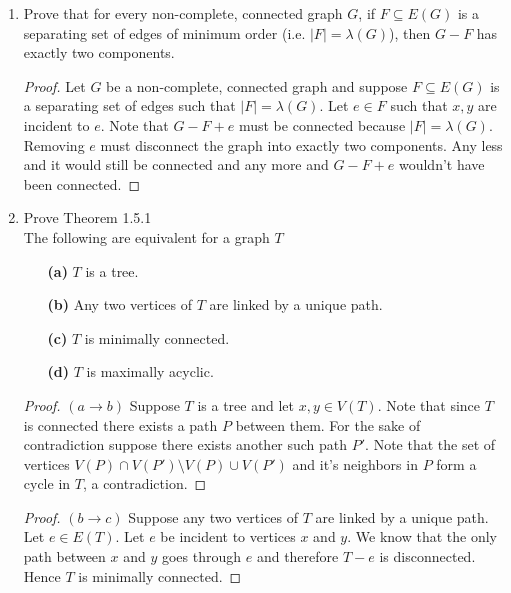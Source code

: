 \documentclass[12pt]{article}
\begin{document}
\begin{enumerate}
	\item Prove that for every non-complete, connected graph $G$, if $F \subseteq E(G)$ is a separating set of edges of minimum order (i.e. $|F| =  \lambda(G)$), then $G - F$ has exactly two components.\\
	\begin{proof} Let $G$ be a non-complete, connected graph and suppose $F \subseteq E(G)$ is a separating set of edges such that $|F| =  \lambda(G)$.
	Let $e \in F$ such that $x, y$ are incident to $e$. Note that $G - F + e$ must be connected because $|F| = \lambda(G)$. Removing $e$ must disconnect the graph into exactly two components. Any less and it would still be connected and any more and $G - F + e$ wouldn't have been connected. 
	\end{proof}
	\vspace{.5in}


	\item  Prove Theorem 1.5.1\\
	
	The following are equivalent for a graph $T$
	\begin{enumerate}
		\item[\textbf{(a)}] $T$ is a tree. 
		\item[\textbf{(b)}] Any two vertices of $T$  are linked by a unique path. 
		\item[\textbf{(c)}] $T$ is minimally connected. 
		\item[\textbf{(d)}] $T$ is maximally acyclic. 
	\end{enumerate}


	\begin{proof}$(a \to b)$ Suppose $T$ is a tree and let $x, y \in V(T)$. Note that since $T$ is connected 
		there exists a path $P$ between them. For the sake of contradiction suppose there exists another such path $P'$.
		Note that the set of vertices $V(P)\cap V(P') \setminus V(P)\cup V(P')$ and it's neighbors in $P$ form a cycle in $T$, a contradiction. 
	\end{proof}


	\begin{proof}$(b \to c)$ Suppose any two vertices of $T$ are linked by a unique path. Let $e \in E(T)$. Let $e$ be incident to vertices $x$ and $y$. We know that the only path between $x$ and $y$ goes through $e$ and therefore $T - e$ is disconnected. Hence $T$ is minimally connected. 
	\end{proof}




\end{enumerate}
\end{document}
